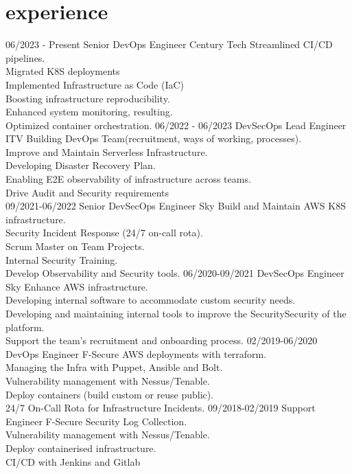 \documentclass[]{twentysecondcv}
\begin{document}
\section{experience}
\begin{twenty}
  \twentyitem
  {06/2023 - Present}
  {Senior DevOps Engineer}
  {Century Tech}
  {
    Streamlined CI/CD pipelines.\\
    Migrated K8S deployments\\
    Implemented Infrastructure as Code (IaC)\\
    Boosting infrastructure reproducibility.\\
    Enhanced system monitoring, resulting.\\
    Optimized container orchestration.
  }
  \twentyitem
  {06/2022 - 06/2023}
  {DevSecOps Lead Engineer}
  {ITV}
  {Building DevOps Team(recruitment, ways of working, processes).\\
    Improve and Maintain Serverless Infrastructure.\\
    Developing Disaster Recovery Plan.\\
    Enabling E2E observability of infrastructure across teams.\\
    Drive Audit and Security requirements\\
  }
  \twentyitem
  {09/2021-06/2022}
  {Senior DevSecOps Engineer}
  {Sky}
  {Build and Maintain AWS K8S infrastructure.\\
    Security Incident Response (24/7 on-call rota).\\
    Scrum Master on Team Projects.\\
    Internal Security Training.\\
    Develop Observability and Security tools.
  }
  \twentyitem
  {06/2020-09/2021}
  {DevSecOps Engineer}
  {Sky}
  {Enhance AWS infrastructure.\\
    Developing internal software to accommodate custom security needs.\\
    Developing and maintaining internal tools to improve the SecuritySecurity of the platform.\\
    Support the team's recruitment and onboarding process.
  }
  \twentyitem
  {02/2019-06/2020}
  {DevOps Engineer}
  {F-Secure}
  {AWS deployments with terraform.\\
    Managing the Infra with Puppet, Ansible and Bolt.\\
    Vulnerability management with Nessus/Tenable.\\
    Deploy containers (build custom or reuse public).\\
    24/7 On-Call Rota for Infrastructure Incidents.
  }
  \twentyitem
  {09/2018-02/2019}
  {Support Engineer}
  {F-Secure}
  {Security Log Collection.\\
    Vulnerability management with Nessus/Tenable.\\
    Deploy containerised infrastructure.\\
    CI/CD with Jenkins and Gitlab
  }
\end{twenty}
\end{document}
